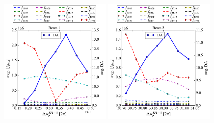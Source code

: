 \documentclass{cernatsnote}
\begin{document}
\begin{figure}[h!]
\centering
\includegraphics[width=0.49\textwidth]{images/rdt4_vs_phase_baseb1.pdf} \hfill \includegraphics[width=0.49\textwidth]{images/rdt4_vs_phase_baseb2.pdf} \\
\caption{\label{scan_da_vs_rdt_base_x} }
\end{figure}
\end{document}
